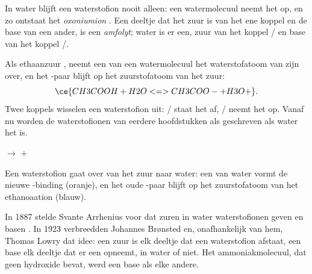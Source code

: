 \begin{definition}\label{def:g12:ka-and-pka:oxonium}
In water blijft een waterstofion nooit alleen: een watermolecuul neemt het
op, en zo ontstaat het \emph{oxoniumion} . Een
deeltje dat het zuur is van het ene koppel en de base van een ander, is
een \emph{amfolyt}; water is er een, zuur van het koppel
/ en base van het koppel /.
\end{definition}

\begin{example}\label{ex:g12:ka-and-pka:acid-water}
Als ethaanzuur , neemt een  van een watermolecuul
het waterstofatoom van zijn  over, en het -paar blijft op
het zuurstofatoom van het zuur:
\[
  \ce{CH3COOH + H2O <=> CH3COO- + H3O+} .
\]
Twee koppels wisselen een waterstofion uit: /
staat het af, / neemt het op. Vanaf nu worden de
waterstofionen van eerdere hoofdstukken als  geschreven als water
het  is.
\end{example}

\begin{omfigure}
\qquad
{}
\qquad$\longrightarrow$\qquad
{}\quad$+$\quad{}

{\small Een waterstofion gaat over van het zuur naar water: een  van water vormt de nieuwe -binding (oranje), en
het oude -paar blijft op het zuurstofatoom van het ethanoaation
(blauw).}
\end{omfigure}

\begin{history}
In 1887 stelde Svante Arrhenius voor dat zuren in water waterstofionen
geven en basen . In 1923 verbreedden Johannes Brønsted
en, onafhankelijk van hem, Thomas Lowry dat idee: een zuur is elk deeltje
dat een waterstofion afstaat, een base elk deeltje dat er een opneemt, in
water of niet. Het ammoniakmolecuul, dat geen hydroxide bevat, werd een
base als elke andere.
\end{history}

